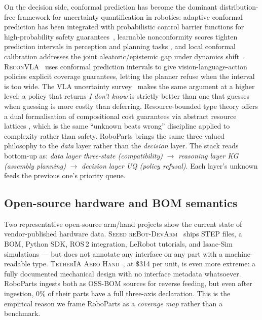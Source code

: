 \documentclass[11pt,twocolumn]{article}
\begin{document}
On the decision side, conformal prediction has become the dominant
distribution-free framework for uncertainty quantification in
robotics: adaptive conformal prediction has been integrated with
probabilistic control barrier functions for high-probability safety
guarantees~\cite{ACP2024}, learnable nonconformity scores tighten
prediction intervals in perception and planning tasks
\cite{LCP2025}, and local conformal calibration addresses the joint
aleatoric/epistemic gap under dynamics shift~\cite{LUCCa2024}.
\textsc{ReconVLA}~\cite{R10} uses conformal prediction intervals to
give vision-language-action policies explicit coverage guarantees,
letting the planner refuse when the interval is too wide. The VLA
uncertainty survey~\cite{R11} makes the same argument at a higher
level: a policy that returns \emph{I don't know} is strictly better
than one that guesses when guessing is more costly than deferring.
Resource-bounded type theory offers a dual formalisation of
compositional cost guarantees via abstract resource lattices
\cite{RBT2025}, which is the same ``unknown beats wrong'' discipline
applied to complexity rather than safety. RoboParts brings the same
three-valued philosophy to the \emph{data} layer rather than the
\emph{decision} layer. The stack reads bottom-up as: \emph{data layer
three-state (compatibility)} $\rightarrow$ \emph{reasoning layer KG
(assembly planning)} $\rightarrow$ \emph{decision layer UQ (policy
refusal)}. Each layer's unknown feeds the previous one's priority
queue.

\subsection{Open-source hardware and BOM semantics}

Two representative open-source arm/hand projects show the current
state of vendor-published hardware data. \textsc{Seeed reBot-DevArm}~\cite{R14}
ships STEP files, a BOM, Python SDK, ROS\,2 integration, LeRobot
tutorials, and Isaac-Sim simulations — but does not annotate any
interface on any part with a machine-readable type. \textsc{TetherIA
Aero Hand}~\cite{R15}, at $\$$314 per unit, is even more extreme:
a fully documented mechanical design with no interface metadata
whatsoever. RoboParts ingests both as OSS-BOM sources for reverse
feeding, but even after ingestion, $0\%$ of their parts have a full
three-axis declaration. This is the empirical reason we frame RoboParts
as a \emph{coverage map} rather than a benchmark.
\end{document}

